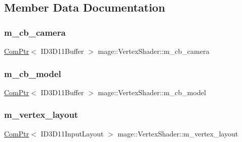 \subsection{Member Data Documentation}
\hypertarget{classmage_1_1_vertex_shader_a347cc37b799fe3b081b312a1bbd8ce24}{}\label{classmage_1_1_vertex_shader_a347cc37b799fe3b081b312a1bbd8ce24} 
\subsubsection{\texorpdfstring{m\+\_\+cb\+\_\+camera}{m\_cb\_camera}}
{\footnotesize\ttfamily \hyperlink{namespacemage_ae74f374780900893caa5555d1031fd79}{Com\+Ptr}$<$ I\+D3\+D11\+Buffer $>$ mage\+::\+Vertex\+Shader\+::m\+\_\+cb\+\_\+camera\hspace{0.3cm}{\ttfamily [protected]}}

\hypertarget{classmage_1_1_vertex_shader_a248495ee84e17e46327de461638f051e}{}\label{classmage_1_1_vertex_shader_a248495ee84e17e46327de461638f051e} 
\subsubsection{\texorpdfstring{m\+\_\+cb\+\_\+model}{m\_cb\_model}}
{\footnotesize\ttfamily \hyperlink{namespacemage_ae74f374780900893caa5555d1031fd79}{Com\+Ptr}$<$ I\+D3\+D11\+Buffer $>$ mage\+::\+Vertex\+Shader\+::m\+\_\+cb\+\_\+model\hspace{0.3cm}{\ttfamily [protected]}}

\hypertarget{classmage_1_1_vertex_shader_a9b9895650b8c7f80af846d75f7d9ddda}{}\label{classmage_1_1_vertex_shader_a9b9895650b8c7f80af846d75f7d9ddda} 
\subsubsection{\texorpdfstring{m\+\_\+vertex\+\_\+layout}{m\_vertex\_layout}}
{\footnotesize\ttfamily \hyperlink{namespacemage_ae74f374780900893caa5555d1031fd79}{Com\+Ptr}$<$ I\+D3\+D11\+Input\+Layout $>$ mage\+::\+Vertex\+Shader\+::m\+\_\+vertex\+\_\+layout\hspace{0.3cm}{\ttfamily [protected]}}

